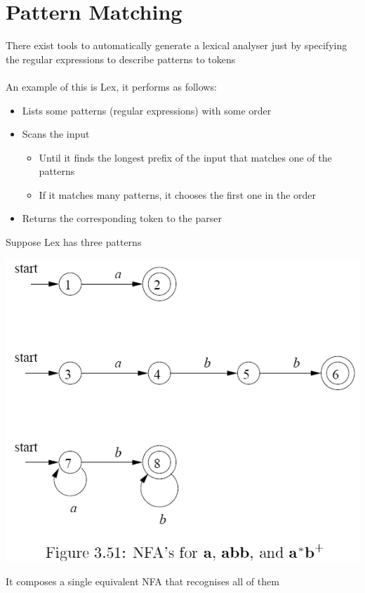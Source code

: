 \documentclass{article}[18pt]
\begin{document}
\section{Pattern Matching}
There exist tools to automatically generate a lexical analyser just by specifying the regular expressions to describe patterns to tokens\\
\\
An example of this is Lex, it performs as follows:
\begin{itemize}
	\item Lists some patterns (regular expressions) with some order
	\item Scans the input
	\begin{itemize}
		\item Until it finds the longest prefix of the input that matches one of the patterns
		\item If it matches many patterns, it chooses the first one in the order
	\end{itemize}
	\item Returns the corresponding token to the parser
\end{itemize}
Suppose Lex has three patterns\\
\begin{center}
	\includegraphics[scale=0.7]{recognise}
\end{center}
It composes a single equivalent NFA that recognises all of them
\end{document}
